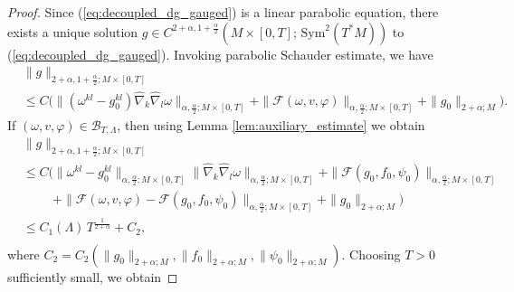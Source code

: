 \documentclass{amsart}
\theoremstyle{definition}
\theoremstyle{remark}
\numberwithin{equation}{section}
\begin{document}
\begin{proof}
	Since (\ref{eq:decoupled_dg_gauged}) is a linear parabolic equation, there exists a unique solution $g\in C^{2+\alpha,1+\frac{\alpha}{2}}(M\times [0,T];\,\text{Sym}^2(T^*M))$ to (\ref{eq:decoupled_dg_gauged}). Invoking parabolic Schauder estimate, we have
	\begin{align*}
		&\|g\|_{2+\alpha,1+\frac{\alpha}{2};M\times[0,T]}\\[1ex]
		& \leq C \Big( \|(\omega^{kl}-g_0^{kl})\hat{\nabla}_k\hat{\nabla}_l\omega \|_{\alpha,\frac{\alpha}{2};M\times[0,T]} + \| \mathcal{F}(\omega,v,\varphi)\|_{\alpha,\frac{\alpha}{2};M\times[0,T]} +\|g_0\|_{2+\alpha;M}\Big).
	\end{align*}
	If $(\omega, v,\varphi)\in \mathcal{B}_{T,\Lambda}$, then using Lemma \ref{lem:auxiliary_estimate} we obtain
	\begin{equation}
		\begin{aligned}
			&\|g\|_{2+\alpha,1+\frac{\alpha}{2};M\times[0,T]}\\[1ex]
			&\leq  C \Big( \|\omega^{kl}-g_0^{kl}\|_{\alpha,\frac{\alpha}{2};M\times[0,T]} \|\hat{\nabla}_k\hat{\nabla}_l\omega \|_{\alpha,\frac{\alpha}{2};M\times[0,T]} + \| \mathcal{F}(g_0,f_0,\psi_0)\|_{\alpha,\frac{\alpha}{2};M\times[0,T]}\\[1ex]
			&\hspace{1cm} + \| \mathcal{F}(\omega, v,\varphi) - \mathcal{F}(g_0,f_0,\psi_0)\|_{\alpha,\frac{\alpha}{2};M\times[0,T]} +\|g_0\|_{2+\alpha;M}\Big)\\[1ex]
			&\leq C_1(\Lambda)\, T^{\frac{1}{2+\alpha}} + C_2,\\[1ex]
		\end{aligned}
	\end{equation}
	where $C_2 = C_2(\|g_0\|_{2+\alpha;M}, \|f_0\|_{2+\alpha;M},\|\psi_0\|_{2+\alpha;M})$. Choosing $T>0$ sufficiently small, we obtain
	

\end{proof}
\end{document}
